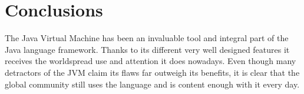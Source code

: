 \documentclass[english,runningheads,a4paper]{llncs}[2018/03/10]
\begin{document}
\section*{Conclusions}

The Java Virtual Machine has been an invaluable tool and integral part of the
Java language framework. Thanks to its different very well designed features it
receives the worldspread use and attention it does nowadays. Even though many
detractors of the JVM claim its flaws far outweigh its benefits, it is clear
that the global community still uses the language and is content enough with it
every day.

\newpage
\printbibliography
\end{document}
